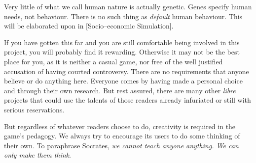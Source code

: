 
Very little of what we call human nature is actually genetic. Genes specify human needs, not behaviour. There is no such thing as {\it default} human behaviour. This will be elaborated upon in [Socio--economic Simulation].
\stopitemize

If you have gotten this far and you are still comfortable being involved in this project, you will probably find it rewarding. Otherwise it may not be the best place for you, as it is neither a casual game, nor free of the well justified accusation of having courted controversy. There are no requirements that anyone believe or do anything here. Everyone comes by having made a personal choice and through their own research. But rest assured, there are many other {\it libre} projects that could use the talents of those readers already infuriated or still with serious reservations.

But regardless of whatever readers choose to do, creativity is required in the game's pedagogy. We always try to encourage its users to do some thinking of their own. To paraphrase Socrates, {\it we cannot teach anyone anything. We can only make them think}.

\StopChapter
